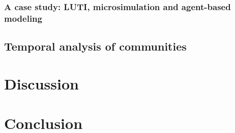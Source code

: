 


\subsubsection*{A case study: LUTI, microsimulation and agent-based modeling}




\subsection*{Temporal analysis of communities}

 







\section*{Discussion}







\section*{Conclusion}




